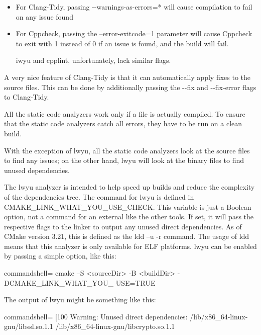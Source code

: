 \begin{itemize}
\item 
For Clang-Tidy, passing -{}-warnings-as-errors=* will cause compilation to fail on any issue found

\item 
For Cppcheck, passing the --error-exitcode=1 parameter will cause Cppcheck to exit with 1 instead of 0 if an issue is found, and the build will fail.

iwyu and cpplint, unfortunately, lack similar flags.
\end{itemize}

A very nice feature of Clang-Tidy is that it can automatically apply fixes to the source files. This can be done by additionally passing the -{}-fix and -{}-fix-error flags to Clang-Tidy.

\begin{tcolorbox}[colback=blue!5!white,colframe=blue!75!black,title=Attention When Building Incrementally]
All the static code analyzers work only if a file is actually compiled. To ensure that the static code analyzers catch all errors, they have to be run on a clean build.
\end{tcolorbox}

With the exception of lwyu, all the static code analyzers look at the source files to find any issues; on the other hand, lwyu will look at the binary files to find unused dependencies.

The lwyu analyzer is intended to help speed up builds and reduce the complexity of the dependencies tree. The command for lwyu is defined in CMAKE\_LINK\_WHAT\_YOU\_USE\_CHECK. This variable is just a Boolean option, not a command for an external like the other tools. If set, it will pass the respective flags to the linker to output any unused direct dependencies. As of CMake version 3.21, this is defined as the ldd –u -r command. The usage of ldd means that this analyzer is only available for ELF platforms. lwyu can be enabled by passing a simple option, like this:

\begin{tcblisting}{commandshell={}}
cmake –S <sourceDir> -B <buildDir> -DCMAKE_LINK_WHAT_YOU_
	USE=TRUE
\end{tcblisting}

The output of lwyu might be something like this:

\begin{tcblisting}{commandshell={}}
[100%
Warning: Unused direct dependencies:
        /lib/x86_64-linux-gnu/libssl.so.1.1
        /lib/x86_64-linux-gnu/libcrypto.so.1.1
\end{tcblisting}

